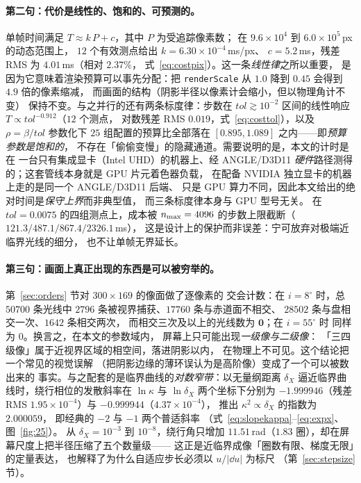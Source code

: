\paragraph{第二句：代价是线性的、饱和的、可预测的。}
单帧时间满足 $T\approx k\,P+c$，其中 $P$ 为受追踪像素数；
在 $9.6\times10^{4}$ 到 $6.0\times10^{5}$\,px 的动态范围上，
$12$ 个有效测点给出 $k=6.30\times10^{-4}$\,ms/px、
$c=5.2$\,ms，残差 RMS 为 $4.01$\,ms（相对 $2.37\%$，
式~\eqref{eq:costpix}）。这一条\emph{线性律}之所以重要，
是因为它意味着渲染预算可以事先分配：把 \texttt{renderScale}
从 $1.0$ 降到 $0.45$ 会得到 $4.9$ 倍的像素缩减，
而画面的结构（阴影半径以像素计会缩小，但以物理角计不变）
保持不变。与之并行的还有两条标度律：步数在 $tol\gtrsim10^{-2}$
区间的线性响应 $T\propto tol^{-0.912}$（$12$ 个测点，
对数残差 RMS $0.019$，式~\eqref{eq:costtol}），以及
$\rho=\beta/tol$ 参数化下 $25$ 组配置的预算比全部落在
$[0.895,1.089]$ 之内——即\emph{预算参数是饱和的}，
不存在「偷偷变慢」的隐藏通道。需要说明的是，本文的计时是在
一台只有集成显卡（Intel UHD）的机器上、经 ANGLE/D3D11
\emph{硬件}路径测得的；这套管线本身就是 GPU 片元着色器负载，
在配备 NVIDIA 独立显卡的机器上走的是同一个 ANGLE/D3D11 后端、
只是 GPU 算力不同，因此本文给出的绝对时间是\emph{保守上界}而非典型值，
而三条标度律本身与 GPU 型号无关。
在 $tol=0.0075$ 的四组测点上，成本被 $n_{\rm max}=4096$
的步数上限截断（$121.3/487.1/867.4/2326.1$\,ms），
这是设计上的保护而非误差：宁可放弃对极端近临界光线的细分，
也不让单帧无界延长。

\paragraph{第三句：画面上真正出现的东西是可以被\textbf{穷举}的。}
第~\ref{sec:orders} 节对 $300\times169$ 的像面做了逐像素的
交会计数：在 $i=8^\circ$ 时，总 $50700$ 条光线中
$2796$ 条被视界捕获、$17760$ 条与赤道面不相交、
$28502$ 条与盘相交一次、$1642$ 条相交两次，
而相交三次及以上的光线数为 $\mathbf{0}$；在 $i=55^\circ$ 时
同样为 $0$。换言之，在本文的参数域内，
屏幕上只可能出现\emph{一级像与二级像}：
「三四级像」属于近视界区域的相空间，落进阴影以内，
在物理上不可见。这个结论把一个常见的视觉误解
（把阴影边缘的薄环误认为是高阶像）变成了一个可以被数出来的
事实。与之配套的是临界曲线的\emph{对数窄带}：以无量纲距离
$\delta_X$ 逼近临界曲线时，绕行相位的发散斜率在
$\ln\kappa$ 与 $\ln\delta_X$ 两个坐标下分别为
$-1.999946$（残差 RMS $1.95\times10^{-4}$）与
$-0.999944$（$4.37\times10^{-4}$），
推出 $\kappa^2\propto\delta_X$ 的指数为 $2.000059$，
即经典的 $-2$ 与 $-1$ 两个普适斜率
（式~\eqref{eq:slopekappa}--\eqref{eq:expx}、图~\ref{fig:25}）。
从 $\delta_X=10^{-3}$ 到 $10^{-8}$，绕行角只增加
$11.51$\,rad（$1.83$ 圈），却在屏幕尺度上把半径压缩了五个数量级——
这正是近临界成像「圈数有限、梯度无限」的定量表达，
也解释了为什么自适应步长必须以 $u/|\dd u|$ 为标尺
（第~\ref{sec:stepsize} 节）。


